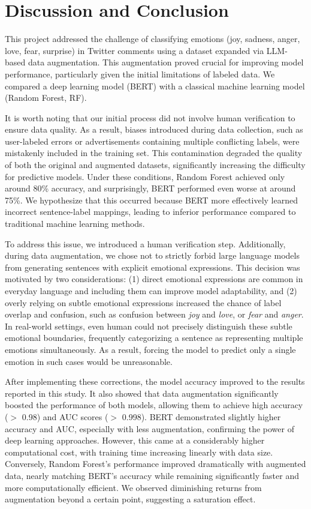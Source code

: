 \documentclass{article}
\begin{document}
\section{Discussion and Conclusion}
This project addressed the challenge of classifying emotions (joy, sadness, anger, love, fear, surprise) in Twitter comments using a dataset expanded via LLM-based data augmentation. This augmentation proved crucial for improving model performance, particularly given the initial limitations of labeled data. We compared a deep learning model (BERT) with a classical machine learning model (Random Forest, RF). 

It is worth noting that our initial process did not involve human verification to ensure data quality. As a result, biases introduced during data collection, such as user-labeled errors or advertisements containing multiple conflicting labels, were mistakenly included in the training set. This contamination degraded the quality of both the original and augmented datasets, significantly increasing the difficulty for predictive models. Under these conditions, Random Forest achieved only around 80\% accuracy, and surprisingly, BERT performed even worse at around 75\%. We hypothesize that this occurred because BERT more effectively learned incorrect sentence-label mappings, leading to inferior performance compared to traditional machine learning methods.

To address this issue, we introduced a human verification step. Additionally, during data augmentation, we chose not to strictly forbid large language models from generating sentences with explicit emotional expressions. This decision was motivated by two considerations: (1) direct emotional expressions are common in everyday language and including them can improve model adaptability, and (2) overly relying on subtle emotional expressions increased the chance of label overlap and confusion, such as confusion between \textit{joy} and \textit{love}, or \textit{fear} and \textit{anger}. In real-world settings, even human could not precisely distinguish these subtle emotional boundaries, frequently categorizing a sentence as representing multiple emotions simultaneously. As a result, forcing the model to predict only a single emotion in such cases would be unreasonable.

After implementing these corrections, the model accuracy improved to the results reported in this study. It also showed that data augmentation significantly boosted the performance of both models, allowing them to achieve high accuracy ($>$ 0.98) and AUC scores ($>$ 0.998). BERT demonstrated slightly higher accuracy and AUC, especially with less augmentation, confirming the power of deep learning approaches. However, this came at a considerably higher computational cost, with training time increasing linearly with data size. Conversely, Random Forest's performance improved dramatically with augmented data, nearly matching BERT's accuracy while remaining significantly faster and more computationally efficient. We observed diminishing returns from augmentation beyond a certain point, suggesting a saturation effect. 
\end{document}
